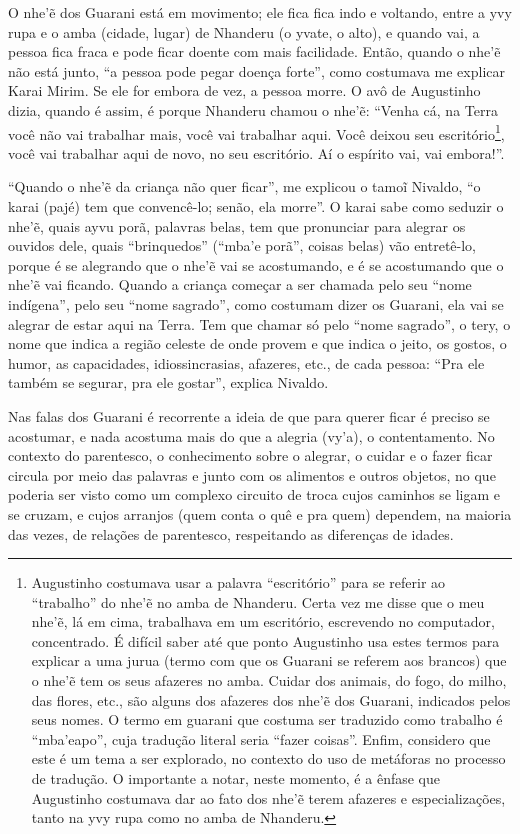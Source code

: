 O nhe’\~{e} dos Guarani está em movimento; ele fica fica indo e
voltando, entre a yvy rupa e o amba (cidade, lugar) de Nhanderu (o
yvate, o alto), e quando vai, a pessoa fica fraca e pode ficar doente
com mais facilidade. Então, quando o nhe’\~{e} não está junto, ``a
pessoa pode pegar doença forte'', como costumava me explicar Karai
Mirim. Se ele for embora de vez, a pessoa morre. O avô de Augustinho
dizia, quando é assim, é porque Nhanderu chamou o nhe’\~{e}: ``Venha
cá, na Terra você não vai trabalhar mais, você vai trabalhar aqui. Você
deixou seu escritório\footnote{Augustinho costumava usar a palavra
``escritório'' para se referir ao ``trabalho'' do nhe’\~{e} no amba de
Nhanderu. Certa vez me disse que o meu nhe’\~{e}, lá em cima,
trabalhava em um escritório, escrevendo no computador, concentrado. É
difícil saber até que ponto Augustinho usa estes termos para explicar a
uma jurua (termo com que os Guarani se referem aos brancos) que o
nhe’\~{e} tem os seus afazeres no amba. Cuidar dos animais, do fogo,
do milho, das flores, etc., são alguns dos afazeres dos nhe’\~{e} dos
Guarani, indicados pelos seus nomes. O termo em guarani que costuma ser
traduzido como trabalho é ``mba’eapo'', cuja tradução literal seria
``fazer coisas''. Enfim, considero que este é um tema a ser explorado, no
contexto do uso de metáforas no processo de tradução. O importante a
notar, neste momento, é a ênfase que Augustinho costumava dar ao fato
dos nhe’\~{e} terem afazeres e especializações, tanto na yvy rupa como
no amba de Nhanderu.}, você vai trabalhar aqui de novo, no seu
escritório. Aí o espírito vai, vai embora!''.

``Quando o nhe’\~{e} da criança não quer ficar'', me explicou o
tamo\~{i} Nivaldo, ``o karai (pajé) tem que convencê-lo; senão, ela
morre''. O karai sabe como seduzir o nhe’\~{e}, quais ayvu porã,
palavras belas, tem que pronunciar para alegrar os ouvidos dele, quais
``brinquedos'' (``mba’e porã'', coisas belas) vão entretê-lo, porque é se
alegrando que o nhe’\~{e} vai se acostumando, e é se acostumando que
o nhe’\~{e} vai ficando. Quando a criança começar a ser chamada pelo
seu ``nome indígena'', pelo seu ``nome sagrado'', como costumam dizer os
Guarani, ela vai se alegrar de estar aqui na Terra. Tem que chamar só
pelo ``nome sagrado'', o tery, o nome que indica a região celeste de onde
provem e que indica o jeito, os gostos, o humor, as capacidades,
idiossincrasias, afazeres, etc., de cada pessoa: ``Pra ele também se
segurar, pra ele gostar'', explica Nivaldo.

Nas falas dos Guarani é recorrente a ideia de que para querer ficar é
preciso se acostumar, e nada acostuma mais do que a alegria (vy’a), o
contentamento. No contexto do parentesco, o conhecimento sobre o
alegrar, o cuidar e o fazer ficar circula por meio das palavras e junto
com os alimentos e outros objetos, no que poderia ser visto como um
complexo circuito de troca cujos caminhos se ligam e se cruzam, e cujos
arranjos (quem conta o quê e pra quem) dependem, na maioria das vezes,
de relações de parentesco, respeitando as diferenças de idades.

